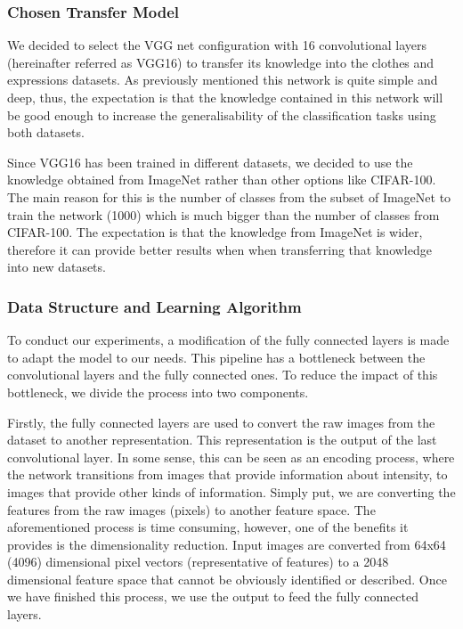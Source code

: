 \documentclass{article}
\begin{document}
\subsubsection{\textbf{Chosen Transfer Model}}

We decided to select the VGG net configuration with 16 convolutional layers (hereinafter referred as VGG16) to transfer its knowledge into the clothes and expressions datasets. As previously mentioned this network is quite simple and deep, thus, the expectation is that the knowledge contained in this network will be good enough to increase the generalisability of the classification tasks using both datasets.

Since VGG16 has been trained in different datasets, we decided to use the knowledge obtained from ImageNet rather than other options like CIFAR-100. The main reason for this is the number of classes from the subset of ImageNet to train the network (1000) which is much bigger than the number of classes from CIFAR-100. The expectation is that the knowledge from ImageNet is wider, therefore it can provide better results when when transferring that knowledge into new datasets. 

\subsubsection{\textbf{Data Structure and Learning Algorithm}}

To conduct our experiments, a modification of the fully connected layers is made to adapt the model to our needs. This pipeline has a bottleneck between the convolutional layers and the fully connected ones. To reduce the impact of this bottleneck, we divide the process into two components.

Firstly, the fully connected layers are used to convert the raw images from the dataset to another representation. This representation is the output of the last convolutional layer. In some sense, this can be seen as an encoding process, where the network transitions from images that provide information about intensity, to images that provide other kinds of information. Simply put, we are converting the features from the raw images (pixels) to another feature space. The aforementioned process is time consuming, however, one of the benefits it provides is the dimensionality reduction. Input images are converted from 64x64 (4096) dimensional pixel vectors (representative of features) to a 2048 dimensional feature space that cannot be obviously identified or described. Once we have finished this process, we use the output to feed the fully connected layers.
\end{document}
